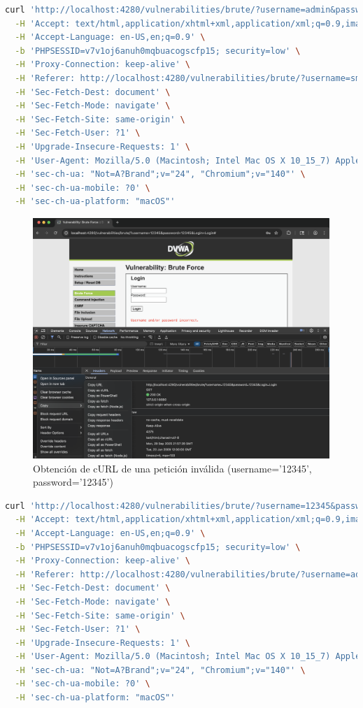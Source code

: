 \documentclass[letter,12pt]{article}
\begin{document}
\begin{lstlisting}[language=bash, caption={cURL de petición válida}]
curl 'http://localhost:4280/vulnerabilities/brute/?username=admin&password=password&Login=Login' \
  -H 'Accept: text/html,application/xhtml+xml,application/xml;q=0.9,image/avif,image/webp,image/apng,*/*;q=0.8,application/signed-exchange;v=b3;q=0.7' \
  -H 'Accept-Language: en-US,en;q=0.9' \
  -b 'PHPSESSID=v7v1oj6anuh0mqbuacogscfp15; security=low' \
  -H 'Proxy-Connection: keep-alive' \
  -H 'Referer: http://localhost:4280/vulnerabilities/brute/?username=smithy&password=password&Login=Login' \
  -H 'Sec-Fetch-Dest: document' \
  -H 'Sec-Fetch-Mode: navigate' \
  -H 'Sec-Fetch-Site: same-origin' \
  -H 'Sec-Fetch-User: ?1' \
  -H 'Upgrade-Insecure-Requests: 1' \
  -H 'User-Agent: Mozilla/5.0 (Macintosh; Intel Mac OS X 10_15_7) AppleWebKit/537.36 (KHTML, like Gecko) Chrome/140.0.0.0 Safari/537.36' \
  -H 'sec-ch-ua: "Not=A?Brand";v="24", "Chromium";v="140"' \
  -H 'sec-ch-ua-mobile: ?0' \
  -H 'sec-ch-ua-platform: "macOS"'
\end{lstlisting}

\begin{figure}[H]
    \centering
    \includegraphics[width=0.65\linewidth]{Imagenes/cURL_obtain_invalid.png}
    \caption{Obtención de cURL de una petición inválida (username='12345', password='12345')}
    \label{fig:placeholder}
\end{figure}
\begin{lstlisting}[language=bash, caption={cURL de petición inválida}]
curl 'http://localhost:4280/vulnerabilities/brute/?username=12345&password=12345&Login=Login' \
  -H 'Accept: text/html,application/xhtml+xml,application/xml;q=0.9,image/avif,image/webp,image/apng,*/*;q=0.8,application/signed-exchange;v=b3;q=0.7' \
  -H 'Accept-Language: en-US,en;q=0.9' \
  -b 'PHPSESSID=v7v1oj6anuh0mqbuacogscfp15; security=low' \
  -H 'Proxy-Connection: keep-alive' \
  -H 'Referer: http://localhost:4280/vulnerabilities/brute/?username=admin&password=password&Login=Login' \
  -H 'Sec-Fetch-Dest: document' \
  -H 'Sec-Fetch-Mode: navigate' \
  -H 'Sec-Fetch-Site: same-origin' \
  -H 'Sec-Fetch-User: ?1' \
  -H 'Upgrade-Insecure-Requests: 1' \
  -H 'User-Agent: Mozilla/5.0 (Macintosh; Intel Mac OS X 10_15_7) AppleWebKit/537.36 (KHTML, like Gecko) Chrome/140.0.0.0 Safari/537.36' \
  -H 'sec-ch-ua: "Not=A?Brand";v="24", "Chromium";v="140"' \
  -H 'sec-ch-ua-mobile: ?0' \
  -H 'sec-ch-ua-platform: "macOS"'
\end{lstlisting}
\end{document}
